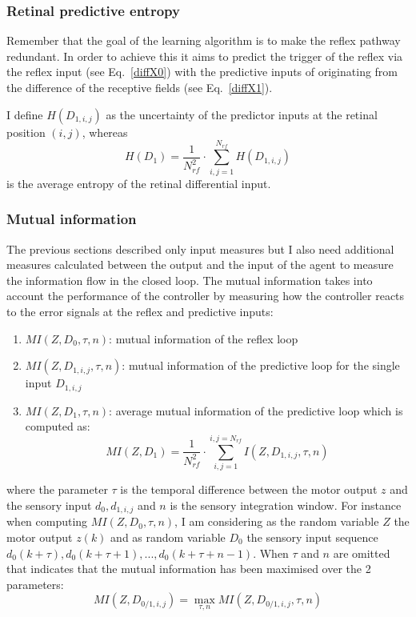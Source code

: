 \subsubsection{Retinal predictive entropy}
Remember that the goal of the learning algorithm is to make
the reflex pathway redundant. In order to achieve this
it aims to predict the trigger of the reflex via the reflex
input (see Eq.~\ref{diffX0})
with the predictive inputs of originating from the
difference of the receptive fields (see Eq.~\ref{diffX1}).

I define $H(D_{1,i,j})$ as the uncertainty of the predictor
inputs at the retinal position $(i,j)$, whereas 
\begin{equation}
H(D_{1})=\frac{1}{N_{rf}^2}\cdot \sum\limits_{i,j=1}^{N_{rf}} H(D_{1,i,j})
\end{equation}
is the average entropy of the retinal differential input.

\subsubsection{Mutual information}
\label{sec:MutualInfo}
The previous sections described only input measures but I also need additional
 measures calculated between the output and the input of the agent to measure
the information flow in the closed loop.
The mutual information takes into account the performance of the controller
by measuring how the controller reacts to the error signals at the
reflex and predictive inputs:
\begin{enumerate}
\item $MI(Z,D_0,\tau,n)$: mutual information of the reflex loop
\item $MI(Z,D_{1,i,j},\tau,n)$: mutual information of the predictive loop for
  the single input $D_{1,i,j}$
\item $MI(Z,D_1,\tau,n)$: average mutual information of the predictive loop
  which is computed as:
  \begin{equation}
    MI(Z,D_{1})=\frac{1}{N_{rf}^2}\cdot \sum\limits_{i,j=1}^{i,j=N_{rf}} I(Z,D_{1,i,j},\tau,n)
  \end{equation}
\end{enumerate}
where the parameter $\tau$ is the temporal difference between the motor output $z$ 
and the sensory input $d_0,d_{1,i,j}$ and $n$ is the sensory integration window.
For instance when computing $MI(Z,D_0,\tau,n)$, I am considering as the 
random variable $Z$ the motor output $z(k)$ and as random variable $D_0$ the
sensory input sequence $d_{0}(k+\tau),d_{0}(k+\tau+1),...,d_{0}(k+\tau+n-1)$. 
When $\tau$ and $n$ are omitted that indicates that the mutual information has been maximised 
over the 2 parameters:
\begin{equation}
MI(Z,D_{0/1,i,j})=\max_{\tau,n} MI(Z,D_{0/1,i,j},\tau,n)
\end{equation}

